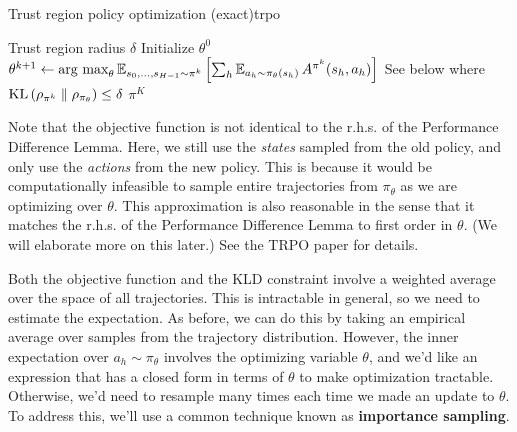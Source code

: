 \documentclass[\main/main]{subfiles}
\begin{document}
\begin{definition}{Trust region policy optimization (exact)}{trpo}
    \begin{algorithmic}
        \Require Trust region radius $\delta$
        \State Initialize $\theta^0$
        \State $\theta^{k+1} \gets \operatorname*{\textrm{arg\ max}}_{\theta} \operatorname*{\mathbb{E}}_{s_0, \dots, s_{H-1} \sim \pi^k} \left[ \sum_h \operatorname*{\mathbb{E}}_{a_h \sim \pi_\theta(s_h)} A^{\pi^k}(s_h, a_h) \right]$
        \Comment See below
        \State where $\mathrm{KL}\left(\rho_{\pi^k} \parallel \rho_{\pi_{\theta}}\right) \le \delta$
        \EndFor
        \State \Return $\pi^K$
    \end{algorithmic}

    Note that the objective function is not identical to the r.h.s. of the Performance Difference Lemma. Here, we still use the \emph{states} sampled from the old policy, and only use the \emph{actions} from the new policy.
    This is because it would be computationally infeasible to sample entire trajectories from $\pi_\theta$ as we are optimizing over $\theta$.
    This approximation is also reasonable in the sense that it matches the r.h.s. of the Performance Difference Lemma to first order in $\theta$. (We will elaborate more on this later.)
    See the TRPO paper for details.
\end{definition}

Both the objective function and the KLD constraint involve a weighted average over the space of all trajectories. This is intractable in general, so we need to estimate the expectation.
As before, we can do this by taking an empirical average over samples from the trajectory distribution.
However, the inner expectation over $a_h \sim \pi_{\theta}$ involves the optimizing variable $\theta$, and we'd like an expression that has a closed form in terms of $\theta$ to make optimization tractable. Otherwise, we'd need to resample many times each time we made an update to $\theta$.
To address this, we'll use a common technique known as \textbf{importance sampling}.
\end{document}
